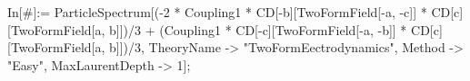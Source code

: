 In[#]:= ParticleSpectrum[(-2 * Coupling1 * CD[-b][TwoFormField[-a, -c]] * CD[c][TwoFormField[a, b]])/3 + (Coupling1 * CD[-c][TwoFormField[-a, -b]] * CD[c][TwoFormField[a, b]])/3, TheoryName -> "TwoFormEectrodynamics", Method -> "Easy", MaxLaurentDepth -> 1]; 